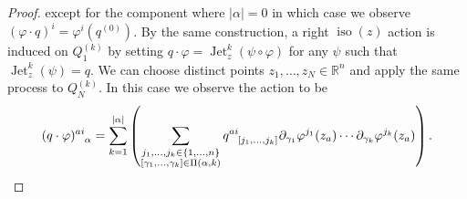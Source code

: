 \documentclass[12pt]{amsart}
\newcommand{\R}{\ensuremath{\mathbb{R}}}
\DeclareMathOperator{\Jet}{Jet}
\DeclareMathOperator{\iso}{iso}
\begin{document}
\begin{proof}
    except for the component where $|\alpha | = 0$ in which case we observe $(\varphi \cdot q)^i = \varphi^i(q^{(0)})$.
    By the same construction, a right $\iso(z)$ action is induced
    on $Q_1^{(k)}$ by setting $q \cdot \varphi = \Jet^k_z(\psi \circ \varphi)$ for any $\psi$ such that $\Jet^k_z(\psi) = q$.
    We can choose distinct points $z_1,\dots,z_N \in \R^n$
    and apply the same process to $Q_N^{(k)}$.  In this case we observe the action to be
    \begin{align*}
      (q \cdot \varphi)\indices{^{ai}_\alpha} = \sum_{k=1}^{|\alpha|}
      \left(
        \sum_{
        \substack{
          j_1,\dots,j_k \in \{1,\dots,n\} \\
          [\gamma_1,\dots,\gamma_k] \in \Pi(\alpha , k)
          }
          }
          q\indices{^{ai}_{[j_1,\dots,j_k]}}
          \partial_{\gamma_1} \varphi^{j_1}(z_a) \cdots
          \partial_{\gamma_k} \varphi^{j_k}(z_a)
        \right).
    \end{align*}
  \end{proof}
  
\end{document}

